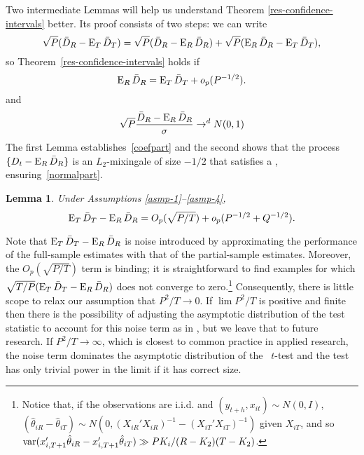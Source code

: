 \documentclass[11pt]{article}
\newtheorem{lem}{Lemma}
\begin{document}
Two intermediate Lemmas will help us understand Theorem
\ref{res-confidence-intervals} better.  Its proof consists of two
steps: we can write
\begin{equation}
  \sqrt{P} (\bar{D}_{R} - \operatorname{E}_T \bar{D}_{T}) = \sqrt{P} (\bar{D}_{R} - \operatorname{E}_R
  \bar{D}_{R}) + \sqrt{P} (\operatorname{E}_R \bar{D}_{R} - \operatorname{E}_T \bar{D}_{T}),
\end{equation}
so Theorem~\ref{res-confidence-intervals} holds if
\begin{equation}\label{coefpart}
  \operatorname{E}_R \bar{D}_{R} = \operatorname{E}_T \bar{D}_{T} + o_p(P^{-1/2}).
\end{equation}
and
\begin{equation}\label{normalpart}
  \sqrt{P}\frac{\bar{D}_{R} - \operatorname{E}_R \bar{D}_{R}}{\sigma} \to^d N(0,1)
\end{equation}
The first Lemma establishes~\eqref{coefpart} and the second shows that
the process $\{D_t - \operatorname{E}_R \bar{D}_{R}\}$ is an $L_2$-mixingale of size
$-1/2$ that satisfies a \clt, ensuring~\eqref{normalpart}.

\begin{lem} \label{res-convergence}
  Under Assumptions \ref{asmp-1}--\ref{asmp-4},
  \begin{equation}\label{eq:7}
    \operatorname{E}_T \bar{D}_{T} - \operatorname{E}_R \bar{D}_{R} = O_p(\sqrt{P/T}) + o_p(P^{-1/2} + Q^{-1/2}).
  \end{equation}
\end{lem}

Note that $\operatorname{E}_T \bar{D}_{T} - \operatorname{E}_R \bar{D}_{R}$ is noise introduced by
approximating the performance of the full-sample estimates with that
of the partial-sample estimates.  Moreover, the $O_p(\sqrt{P/T})$ term
is binding; it is straightforward to find examples for which
$\sqrt{T/P}(\operatorname{E}_T \bar{D}_{T} - \operatorname{E}_R \bar{D}_{R})$ does not converge to
zero.\footnote{Notice that, if the observations are i.i.d. and
  $(y_{t+h}, x_{it}) \sim N(0,I)$, $(\hat{\theta}_{iR} -
  \hat{\theta}_{iT}) \sim N(0, (X_{iR}'X_{iR})^{-1} -
  (X_{iT}'X_{iT})^{-1})$ given $X_{iT}$, and so
  $\operatorname{var}(x_{i,T+1}'\hat{\theta}_{iR} - x_{i,T+1}'
  \hat{\theta}_{iT}) \gg P K_i / (R - K_2)(T - K_2)$.}
Consequently, there is little scope to relax our assumption that
$P^2/T \to 0$.  If $\lim P^2/T$ is positive and finite then there is
the possibility of adjusting the asymptotic distribution of the test
statistic to account for this noise term as in \citet{Wes:96}, but we
leave that to future research.  If $P^2/T \to \infty$, which is
closest to common practice in applied research, the noise term
dominates the asymptotic distribution of the \oos\ $t$-test and the
test has only trivial power in the limit if it has correct size.
\end{document}
